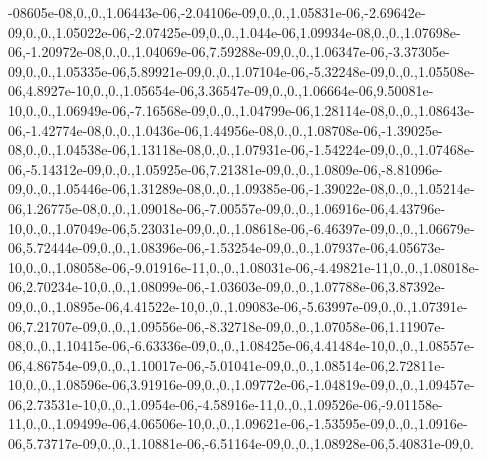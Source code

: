 {-08605e-\/08,0.,0.,1.\-06443e-\/06,-\/2.\-04106e-\/09,0.,0.,1.\-05831e-\/06,-\/2.\-69642e-\/09,0.,0.,1.\-05022e-\/06,-\/2.\-07425e-\/09,0.,0.,1.\-044e-\/06,1.\-09934e-\/08,0.,0.,1.\-07698e-\/06,-\/1.\-20972e-\/08,0.,0.,1.\-04069e-\/06,7.\-59288e-\/09,0.,0.,1.\-06347e-\/06,-\/3.\-37305e-\/09,0.,0.,1.\-05335e-\/06,5.\-89921e-\/09,0.,0.,1.\-07104e-\/06,-\/5.\-32248e-\/09,0.,0.,1.\-05508e-\/06,4.\-8927e-\/10,0.,0.,1.\-05654e-\/06,3.\-36547e-\/09,0.,0.,1.\-06664e-\/06,9.\-50081e-\/10,0.,0.,1.\-06949e-\/06,-\/7.\-16568e-\/09,0.,0.,1.\-04799e-\/06,1.\-28114e-\/08,0.,0.,1.\-08643e-\/06,-\/1.\-42774e-\/08,0.,0.,1.\-0436e-\/06,1.\-44956e-\/08,0.,0.,1.\-08708e-\/06,-\/1.\-39025e-\/08,0.,0.,1.\-04538e-\/06,1.\-13118e-\/08,0.,0.,1.\-07931e-\/06,-\/1.\-54224e-\/09,0.,0.,1.\-07468e-\/06,-\/5.\-14312e-\/09,0.,0.,1.\-05925e-\/06,7.\-21381e-\/09,0.,0.,1.\-0809e-\/06,-\/8.\-81096e-\/09,0.,0.,1.\-05446e-\/06,1.\-31289e-\/08,0.,0.,1.\-09385e-\/06,-\/1.\-39022e-\/08,0.,0.,1.\-05214e-\/06,1.\-26775e-\/08,0.,0.,1.\-09018e-\/06,-\/7.\-00557e-\/09,0.,0.,1.\-06916e-\/06,4.\-43796e-\/10,0.,0.,1.\-07049e-\/06,5.\-23031e-\/09,0.,0.,1.\-08618e-\/06,-\/6.\-46397e-\/09,0.,0.,1.\-06679e-\/06,5.\-72444e-\/09,0.,0.,1.\-08396e-\/06,-\/1.\-53254e-\/09,0.,0.,1.\-07937e-\/06,4.\-05673e-\/10,0.,0.,1.\-08058e-\/06,-\/9.\-01916e-\/11,0.,0.,1.\-08031e-\/06,-\/4.\-49821e-\/11,0.,0.,1.\-08018e-\/06,2.\-70234e-\/10,0.,0.,1.\-08099e-\/06,-\/1.\-03603e-\/09,0.,0.,1.\-07788e-\/06,3.\-87392e-\/09,0.,0.,1.\-0895e-\/06,4.\-41522e-\/10,0.,0.,1.\-09083e-\/06,-\/5.\-63997e-\/09,0.,0.,1.\-07391e-\/06,7.\-21707e-\/09,0.,0.,1.\-09556e-\/06,-\/8.\-32718e-\/09,0.,0.,1.\-07058e-\/06,1.\-11907e-\/08,0.,0.,1.\-10415e-\/06,-\/6.\-63336e-\/09,0.,0.,1.\-08425e-\/06,4.\-41484e-\/10,0.,0.,1.\-08557e-\/06,4.\-86754e-\/09,0.,0.,1.\-10017e-\/06,-\/5.\-01041e-\/09,0.,0.,1.\-08514e-\/06,2.\-72811e-\/10,0.,0.,1.\-08596e-\/06,3.\-91916e-\/09,0.,0.,1.\-09772e-\/06,-\/1.\-04819e-\/09,0.,0.,1.\-09457e-\/06,2.\-73531e-\/10,0.,0.,1.\-0954e-\/06,-\/4.\-58916e-\/11,0.,0.,1.\-09526e-\/06,-\/9.\-01158e-\/11,0.,0.,1.\-09499e-\/06,4.\-06506e-\/10,0.,0.,1.\-09621e-\/06,-\/1.\-53595e-\/09,0.,0.,1.\-0916e-\/06,5.\-73717e-\/09,0.,0.,1.\-10881e-\/06,-\/6.\-51164e-\/09,0.,0.,1.\-08928e-\/06,5.\-40831e-\/09,0.}
